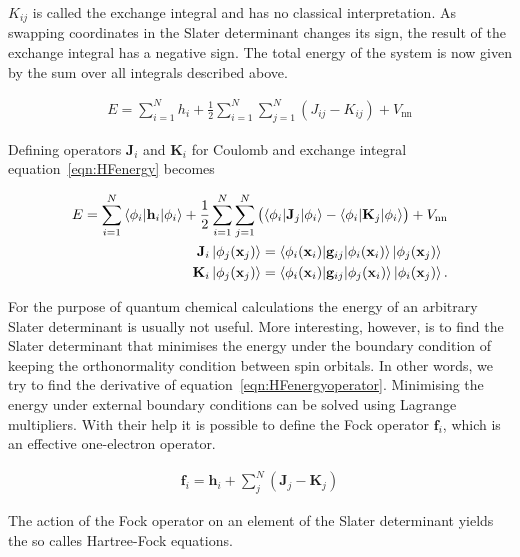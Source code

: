 $K_{ij}$ is called the exchange integral and has no classical interpretation.
As swapping coordinates in the Slater determinant changes its sign, the result
of the exchange integral has a negative sign. The total energy of the system is
now given by the sum over all integrals described above.

\begin{align}
    E=\sum_{i=1}^Nh_i + \frac{1}{2}\sum_{i=1}^N\sum_{j=1}^N(J_{ij}-K_{ij})+V_\text{nn}\label{eqn:HFenergy}
\end{align}

Defining operators $\mathbf{J}_i$ and $\mathbf{K}_i$ for Coulomb and exchange
integral equation~\eqref{eqn:HFenergy} becomes

\begin{align}
    E=\sum_{i=1}^N\braket{\phi_i|\mathbf{h}_i|\phi_i} + \frac{1}{2}\sum_{i=1}^N\sum_{j=1}^N \left( \braket{\phi_i|\mathbf{J}_j|\phi_i} - \braket{\phi_i|\mathbf{K}_j|\phi_i} \right) + V_\text{nn}\\
    \begin{aligned}
		\mathbf{J}_i\ket{\phi_j(\mathbf{x}_j)}&=\braket{\phi_i(\mathbf{x}_i)|\mathbf{g}_{ij}|\phi_i(\mathbf{x}_i)}\ket{\phi_j(\mathbf{x}_j)}\\
		\mathbf{K}_i\ket{\phi_j(\mathbf{x}_j)}&=\braket{\phi_i(\mathbf{x}_i)|\mathbf{g}_{ij}|\phi_j(\mathbf{x}_i)}\ket{\phi_i(\mathbf{x}_j)}.
    \end{aligned}\label{eqn:HFenergyoperator}
\end{align}

For the purpose of quantum chemical calculations the energy of an arbitrary
Slater determinant is usually not useful. More interesting, however, is to find
the Slater determinant that minimises the energy under the boundary condition
of keeping the orthonormality condition between spin orbitals. In other words,
we try to find the derivative of equation~\eqref{eqn:HFenergyoperator}.
Minimising the energy under external boundary conditions can be solved using
Lagrange multipliers. With their help it is possible to define the Fock
operator $\mathbf{f}_i$, which is an effective one-electron operator.

\begin{align}
    \mathbf{f}_i=\mathbf{h}_i + \sum_j^N\left( \mathbf{J}_j - \mathbf{K}_j \right)
\end{align}

The action of the Fock operator on an element of the Slater determinant yields
the so calles Hartree-Fock equations.

